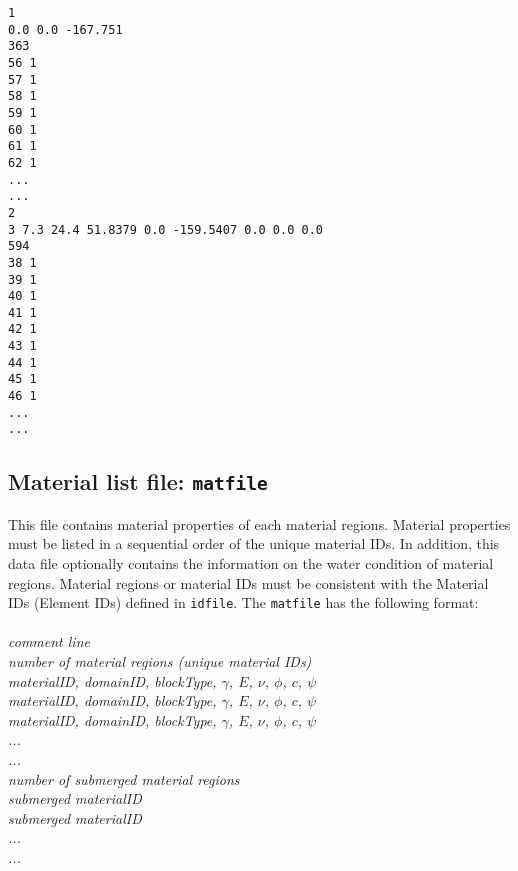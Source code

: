 \texttt{1\\
0.0 0.0 -167.751\\
363\\
56 1\\
57 1\\
58 1\\
59 1\\
60 1\\
61 1\\
62 1\\
...\\
...\\
2\\
3 7.3 24.4 51.8379 0.0 -159.5407 0.0 0.0 0.0\\
594\\
38 1\\
39 1\\
40 1\\
41 1\\
42 1\\
43 1\\
44 1\\
45 1\\
46 1\\
...\\
...}\\

\subsection{Material list file: \texttt{matfile}}

This file contains material properties of each material regions. Material properties must be listed in a sequential order of the unique material IDs. In addition, this data file optionally contains the information on the water condition of material regions. Material regions or material IDs must be consistent with the Material IDs (Element IDs) defined in \texttt{idfile}. The \texttt{matfile} has the following format:\\\\

\emph{comment line}\\
\emph{number of material regions (unique material IDs)\\
materialID, domainID, blockType, $\gamma$, $E$, $\nu$, $\phi$, $c$, $\psi$ \\
materialID, domainID, blockType, $\gamma$, $E$, $\nu$, $\phi$, $c$, $\psi$ \\
materialID, domainID, blockType, $\gamma$, $E$, $\nu$, $\phi$, $c$, $\psi$ \\
...\\
...\\
number of submerged material regions\\
submerged materialID\\
submerged materialID\\
...\\
...\\}

